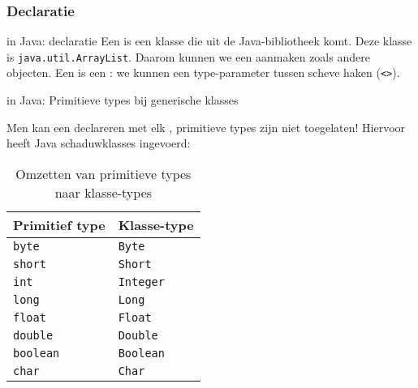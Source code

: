 \subsubsection{Declaratie}
\begin{frame}[fragile]{\dsarraylist{} in Java: declaratie}
Een \dsarraylist{} is een klasse die uit de Java-bibliotheek komt. Deze klasse is \texttt{java.util.ArrayList}. Daarom kunnen we een \dsarraylist{} aanmaken zoals andere objecten. Een \dsarraylist{} is een : we kunnen een type-parameter tussen scheve haken (\texttt{<>}).
\end{frame}
\begin{frame}[fragile]{\dsarraylist{} in Java: Primitieve types bij generische klasses}
\begin{letop}
\small{Men kan een \dsarraylist{} declareren met elk , primitieve types zijn niet toegelaten! Hiervoor heeft Java schaduwklasses ingevoerd:}
\begin{table}
\centering
\small{\begin{tabular}{l|l}
Primitief type&Klasse-type\\\hline
\texttt{byte}&\texttt{Byte}\\
\texttt{short}&\texttt{Short}\\
\texttt{int}&\texttt{Integer}\\
\texttt{long}&\texttt{Long}\\
\texttt{float}&\texttt{Float}\\
\texttt{double}&\texttt{Double}\\
\texttt{boolean}&\texttt{Boolean}\\
\texttt{char}&\texttt{Char}\\
\end{tabular}}
\caption{Omzetten van primitieve types naar klasse-types}
\end{table}
\end{letop}
\end{frame}
